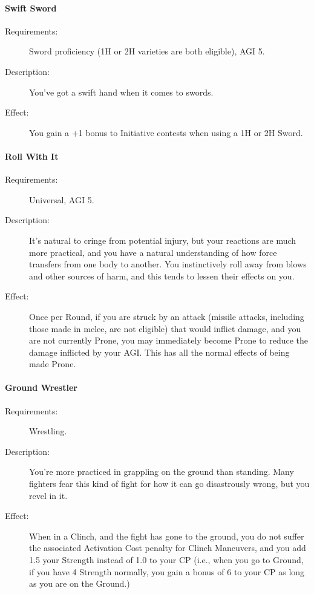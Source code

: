 \documentclass[oneside,11pt,english]{book}
\begin{document}
\paragraph{\label{talent:Swift Sword}Swift Sword}
\begin{description}
	\item [Requirements:] Sword proficiency (1H or 2H varieties are both eligible), AGI 5. 
	\item [Description:] You’ve got a swift hand when it comes to swords. 
	\item [Effect:] You gain a +1 bonus to Initiative contests when using a 1H or 2H Sword. 
	
\end{description}
\paragraph{\label{talent:Roll With It}Roll With It}
\begin{description}
	\item [Requirements:] Universal, AGI 5. 
	\item [Description:] It's natural to cringe from potential injury, but your reactions are much more practical, and you have a natural understanding of how force transfers from one body to another. You instinctively roll 
	away from blows and other sources of harm, and this tends to lessen their effects on you. 
	\item [Effect:] Once per Round, if you are struck by an attack (missile attacks, including those made in melee, 
	are not eligible) that would inflict damage, and you are not currently Prone, you may immediately become 
	Prone to reduce the damage inflicted by your AGI. This has all the normal effects of being made Prone. 
	
\end{description}
\paragraph{\label{talent:Ground Wrestler}Ground Wrestler}
\begin{description}
	\item [Requirements:] Wrestling. 
	\item [Description:] You’re more practiced in grappling on the ground than standing. Many fighters fear this 
	kind of fight for how it can go disastrously wrong, but you revel in it. 
	\item [Effect:] When in a Clinch, and the fight has gone to the ground, you do not suffer the associated 
	Activation Cost penalty for Clinch Maneuvers, and you add 1.5 your Strength instead of 1.0 to your CP 
	(i.e., when you go to Ground, if you have 4 Strength normally, you gain a bonus of 6 to your CP as long 
	as you are on the Ground.) 
	
\end{description}
\end{document}
